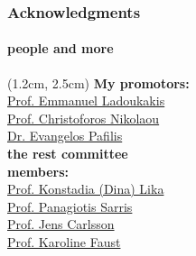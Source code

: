 \documentclass{beamer}
\begin{document}
   \begin{darkframes}

   \begin{frame}

      \frametitle{Acknowledgments}
      \framesubtitle{people and more}

      \begin{textblock*}{4.0cm}(1.2cm, 2.5cm)
         \footnotesize
         \textbf{My promotors: }\\
           \href{https://ladoukakis.weebly.com/}{Prof. Emmanuel Ladoukakis} \\
            \href{http://computational-genomics.weebly.com/}{Prof. Christoforos Nikolaou} \\
            \href{http://lab42open.hcmr.gr/people/evangelospafilis/}{Dr. Evangelos Pafilis} \\
         \bigskip
         \textbf{the rest committee \\ members:} \\
            \href{http://www.biology.uoc.gr/labweb/lika/}{Prof. Konstadia (Dina) Lika} \\
            \href{https://www.biology.uoc.gr/el/personnel/7714}{Prof. Panagiotis Sarris} \\
            \href{https://sites.google.com/view/lab-area52}{Prof. Jens Carlsson} \\
            \href{http://msysbiology.com/}{Prof. Karoline Faust} \\

      \end{textblock*}




\end{frame}
\end{darkframes}
\end{document}
